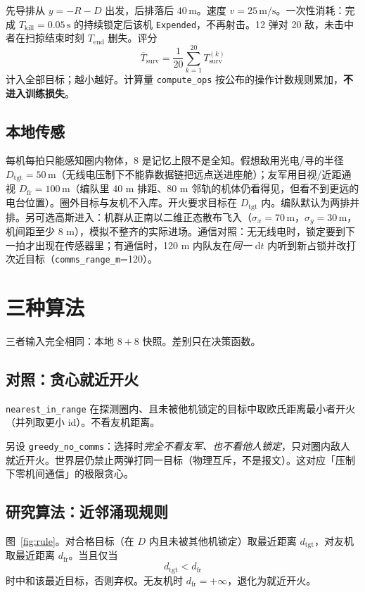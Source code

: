 \documentclass[12pt,a4paper]{article}
\begin{document}
先导排从 $y=-R-D$ 出发，后排落后 $40\,\mathrm{m}$。速度 $v=25\,\mathrm{m/s}$。一次性消耗：完成 $T_{\mathrm{kill}}=0.05\,\mathrm{s}$ 的持续锁定后该机 \texttt{Expended}，不再射击。12 弹对 20 敌，未击中者在扫掠结束时刻 $T_{\mathrm{end}}$ 删失。评分
\begin{equation}
  \overline{T}_{\mathrm{surv}} = \frac{1}{20}\sum_{k=1}^{20} T_{\mathrm{surv}}^{(k)}
\end{equation}
计入全部目标；越小越好。计算量 \texttt{compute\_ops} 按公布的操作计数规则累加，\textbf{不进入训练损失}。

\subsection{本地传感}

每机每拍只能感知圈内物体，8 是记忆上限不是全知。假想敌用光电/寻的半径 $D_{\mathrm{tgt}}=50\,\mathrm{m}$（无线电压制下不能靠数据链把远点送进座舱）；友军用目视/近距通视 $D_{\mathrm{fr}}=100\,\mathrm{m}$（编队里 40 m 排距、80 m 邻轨的机体仍看得见，但看不到更远的电台位置）。圈外目标与友机不入库。开火要求目标在 $D_{\mathrm{tgt}}$ 内。编队默认为两排并排。另可选高斯进入：机群从正南以二维正态散布飞入（$\sigma_x=70\,\mathrm{m}$，$\sigma_y=30\,\mathrm{m}$，机间距至少 8 m），模拟不整齐的实际进场。通信对照：无无线电时，锁定要到下一拍才出现在传感器里；有通信时，120 m 内队友在\emph{同一} $\mathrm{d}t$ 内听到新占锁并改打次近目标（\texttt{comms\_range\_m}=120）。

\section{三种算法}

三者输入完全相同：本地 $8+8$ 快照。差别只在决策函数。

\subsection{对照：贪心就近开火}
\texttt{nearest\_in\_range} 在探测圈内、且未被他机锁定的目标中取欧氏距离最小者开火（并列取更小 id）。不看友机距离。

另设 \texttt{greedy\_no\_comms}：选择时\emph{完全不看友军、也不看他人锁定}，只对圈内敌人就近开火。世界层仍禁止两弹打同一目标（物理互斥，不是报文）。这对应「压制下零机间通信」的极限贪心。

\subsection{研究算法：近邻涌现规则}
图~\ref{fig:rule}。对合格目标（在 $D$ 内且未被其他机锁定）取最近距离 $d_{\mathrm{tgt}}$，对友机取最近距离 $d_{\mathrm{fr}}$。当且仅当
\begin{equation}
  d_{\mathrm{tgt}} < d_{\mathrm{fr}}
\end{equation}
时中和该最近目标，否则弃权。无友机时 $d_{\mathrm{fr}}=+\infty$，退化为就近开火。
\end{document}
